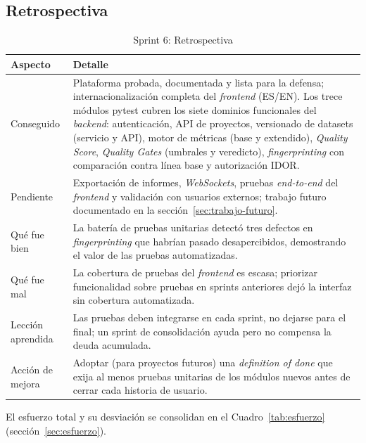 \subsection{Retrospectiva}

\begin{table}[htbp]
  \centering
  \small
  \caption{Sprint 6: Retrospectiva}
  \label{tab:sprint6-retro}
  \begin{tabularx}{\textwidth}{l X}
    \toprule
    \textbf{Aspecto} & \textbf{Detalle} \\
    \midrule
    Conseguido & Plataforma probada, documentada y lista para la defensa;
      internacionalización completa del \emph{frontend} (ES/EN). Los trece
      módulos pytest cubren los siete dominios funcionales del \emph{backend}:
      autenticación, \ac{API} de proyectos, versionado de datasets (servicio y
      \ac{API}), motor de métricas (base y extendido), \emph{Quality Score},
      \emph{Quality Gates} (umbrales y veredicto), \emph{fingerprinting} con
      comparación contra línea base y autorización \ac{IDOR}. \\
    Pendiente & Exportación de informes, \emph{WebSockets}, pruebas
      \emph{end-to-end} del \emph{frontend} y validación con usuarios externos;
      trabajo futuro documentado en la sección~\ref{sec:trabajo-futuro}. \\
    Qué fue bien & La batería de pruebas unitarias detectó tres defectos en
      \emph{fingerprinting} que habrían pasado desapercibidos, demostrando el
      valor de las pruebas automatizadas. \\
    Qué fue mal & La cobertura de pruebas del \emph{frontend} es escasa;
      priorizar funcionalidad sobre pruebas en sprints anteriores dejó la
      interfaz sin cobertura automatizada. \\
    Lección aprendida & Las pruebas deben integrarse en cada sprint, no dejarse
      para el final; un sprint de consolidación ayuda pero no compensa la deuda
      acumulada. \\
    Acción de mejora & Adoptar (para proyectos futuros) una \emph{definition of
      done} que exija al menos pruebas unitarias de los módulos nuevos antes de
      cerrar cada historia de usuario. \\
    \bottomrule
  \end{tabularx}
\end{table}

El esfuerzo total y su desviación se consolidan en el
Cuadro~\ref{tab:esfuerzo} (sección~\ref{sec:esfuerzo}).


